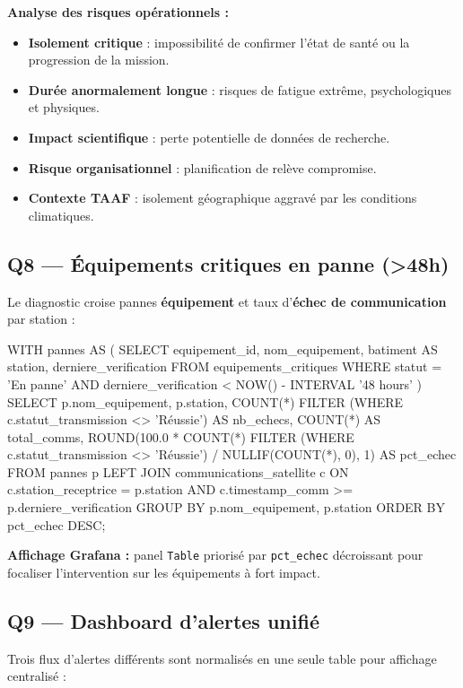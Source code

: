 \documentclass[11pt,a4paper]{article}
\begin{document}
\textbf{Analyse des risques opérationnels :}
\begin{itemize}
  \item \textbf{Isolement critique} : impossibilité de confirmer l'état de santé ou la progression de la mission.
  \item \textbf{Durée anormalement longue} : risques de fatigue extrême, psychologiques et physiques.
  \item \textbf{Impact scientifique} : perte potentielle de données de recherche.
  \item \textbf{Risque organisationnel} : planification de relève compromise.
  \item \textbf{Contexte TAAF} : isolement géographique aggravé par les conditions climatiques.
\end{itemize}

\subsection{Q8 — Équipements critiques en panne (\textgreater{}48h)}

Le diagnostic croise pannes \textbf{équipement} et taux d'\textbf{échec de communication} par station :

\begin{sqlbox}
WITH pannes AS (
  SELECT equipement_id, nom_equipement, batiment AS station,
         derniere_verification
  FROM equipements_critiques
  WHERE statut = 'En panne'
    AND derniere_verification < NOW() - INTERVAL '48 hours'
)
SELECT p.nom_equipement, p.station,
       COUNT(*) FILTER (WHERE c.statut_transmission <> 'Réussie') AS nb_echecs,
       COUNT(*) AS total_comms,
       ROUND(100.0 * COUNT(*) FILTER (WHERE c.statut_transmission <> 'Réussie')
             / NULLIF(COUNT(*), 0), 1) AS pct_echec
FROM pannes p
LEFT JOIN communications_satellite c
       ON c.station_receptrice = p.station
      AND c.timestamp_comm >= p.derniere_verification
GROUP BY p.nom_equipement, p.station
ORDER BY pct_echec DESC;
\end{sqlbox}

\textbf{Affichage Grafana :} panel \texttt{Table} priorisé par \texttt{pct\_echec} décroissant pour focaliser l'intervention sur les équipements à fort impact.

\subsection{Q9 — Dashboard d'alertes unifié}

Trois flux d'alertes différents sont normalisés en une seule table pour affichage centralisé :
\end{document}
